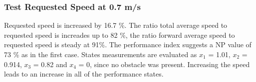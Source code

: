 \subsubsection{Test Requested Speed at 0.7 m/s}
Requested speed is increased by 16.7 \%.
The ratio total average speed to requested speed is increades up to 82 \%, the ratio forward average speed to requested speed is steady at 91\%. The performance index suggests a NP value of 73 \% as in the first case.
States measurements are evaluated as $x_1$ = 1.01, $x_2$ = 0.914, $x_3$ = 0.82 and $x_4$ = 0, since no obstacle was present. Increasing the speed leads to an increase in all of the performance states.
\begin{table}[H]
\centering
{}
\end{table}
